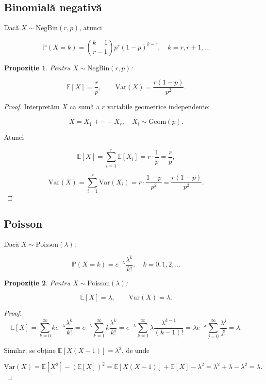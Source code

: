 \documentclass[12pt]{article}
\theoremstyle{plain}
\newtheorem{proposition}{Propoziție}
\begin{document}
\subsection{Binomială negativă}

Dacă $X \sim \mathrm{NegBin}(r,p)$, atunci


\[
\mathbb{P}(X=k) = \binom{k-1}{r-1} p^r (1-p)^{k-r},\quad k=r,r+1,\dots
\]



\begin{proposition}
Pentru $X \sim \mathrm{NegBin}(r,p)$:


\[
\mathbb{E}[X] = \frac{r}{p},\qquad
\mathrm{Var}(X) = \frac{r(1-p)}{p^2}.
\]


\end{proposition}

\begin{proof}
Interpretăm $X$ ca sumă a $r$ variabile geometrice independente:


\[
X = X_1 + \cdots + X_r,\quad X_i \sim \mathrm{Geom}(p).
\]


Atunci


\[
\mathbb{E}[X] = \sum_{i=1}^r \mathbb{E}[X_i] = r \cdot \frac{1}{p} = \frac{r}{p},
\]




\[
\mathrm{Var}(X) = \sum_{i=1}^r \mathrm{Var}(X_i) = r \cdot \frac{1-p}{p^2} = \frac{r(1-p)}{p^2}.
\]


\end{proof}

\subsection{Poisson}

Dacă $X \sim \mathrm{Poisson}(\lambda)$:


\[
\mathbb{P}(X=k) = e^{-\lambda}\frac{\lambda^k}{k!},\quad k=0,1,2,\dots
\]



\begin{proposition}
Pentru $X \sim \mathrm{Poisson}(\lambda)$:


\[
\mathbb{E}[X] = \lambda,\qquad
\mathrm{Var}(X) = \lambda.
\]


\end{proposition}

\begin{proof}


\[
\mathbb{E}[X] = \sum_{k=0}^\infty k e^{-\lambda}\frac{\lambda^k}{k!}
= e^{-\lambda}\sum_{k=1}^\infty k \frac{\lambda^k}{k!}
= e^{-\lambda}\sum_{k=1}^\infty \lambda \frac{\lambda^{k-1}}{(k-1)!}
= \lambda e^{-\lambda} \sum_{j=0}^\infty \frac{\lambda^j}{j!} = \lambda.
\]


Similar, se obține $\mathbb{E}[X(X-1)] = \lambda^2$, de unde


\[
\mathrm{Var}(X) = \mathbb{E}[X^2] - (\mathbb{E}[X])^2
= \mathbb{E}[X(X-1)] + \mathbb{E}[X] - \lambda^2 = \lambda^2 + \lambda - \lambda^2 = \lambda.
\]


\end{proof}
\end{document}
